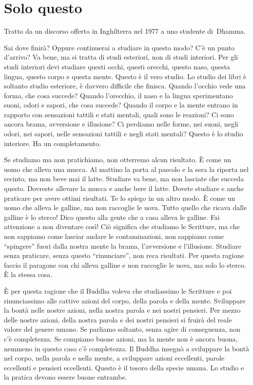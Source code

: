 \chapter{Solo questo}

\begin{openingQuote}
  Tratto da un discorso offerto in Inghilterra nel 1977 a uno studente
  di~Dhamma.
\end{openingQuote}

Sai dove finirà? Oppure continuerai a studiare in questo modo? C'è un
punto d'arrivo? Va bene, ma si tratta di studi esteriori, non di studi
interiori. Per gli studi interiori devi studiare questi occhi, questi
orecchi, questo naso, questa lingua, questo corpo e questa mente. Questo
è il vero studio. Lo studio dei libri è soltanto studio esteriore, è
davvero difficile che finisca. Quando l'occhio vede una forma, che cosa
succede? Quando l'orecchio, il naso e la lingua sperimentano suoni,
odori e sapori, che cosa succede? Quando il corpo e la mente entrano in
rapporto con sensazioni tattili e stati mentali, quali sono le reazioni?
Ci sono ancora brama, avversione e illusione? Ci perdiamo nelle forme,
nei suoni, negli odori, nei sapori, nelle sensazioni tattili e negli
stati mentali? Questo è lo studio interiore. Ha un completamento.

Se studiamo ma non pratichiamo, non otterremo alcun risultato. È come un
uomo che alleva una mucca. Al mattino la porta al pascolo e la sera la
riporta nel recinto, ma non beve mai il latte. Studiare va bene, ma non
lasciate che succeda questo. Dovreste allevare la mucca e anche bere il
latte. Dovete studiare e anche praticare per avere ottimi risultati. Te
lo spiego in un altro modo. È come un uomo che alleva le galline, ma non
raccoglie le uova. Tutto quello che ricava dalle galline è lo sterco!
Dico questo alla gente che a casa alleva le galline. Fai attenzione a
non diventare così! Ciò significa che studiamo le Scritture, ma che non
sappiamo come lasciar andare le contaminazioni, non sappiamo come
``spingere'' fuori dalla nostra mente la brama, l'avversione e
l'illusione. Studiare senza praticare, senza questo ``rinunciare'', non
reca risultati. Per questa ragione faccio il paragone con chi alleva
galline e non raccoglie le uova, ma solo lo sterco. È la stessa cosa.

È per questa ragione che il Buddha voleva che studiassimo le Scritture e
poi rinunciassimo alle cattive azioni del corpo, della parola e della
mente. Sviluppare la bontà nelle nostre azioni, nella nostra parola e
nei nostri pensieri. Per mezzo delle nostre azioni, della nostra parola
e dei nostri pensieri si fruirà del reale valore del genere umano. Se
parliamo soltanto, senza agire di conseguenza, non c'è completezza. Se
compiamo buone azioni, ma la mente non è ancora buona, nemmeno in questo
caso c'è completezza. Il Buddha insegnò a sviluppare la bontà nel corpo,
nella parola e nella mente, a sviluppare azioni eccellenti, parole
eccellenti e pensieri eccellenti. Questo è il tesoro della specie umana.
Lo studio e la pratica devono essere buone entrambe.

